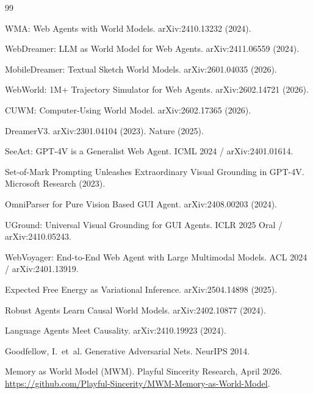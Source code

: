 \documentclass[12pt]{article}
\theoremstyle{definition}
\theoremstyle{remark}
\begin{document}
\begin{thebibliography}{99}

WMA: Web Agents with World Models. arXiv:2410.13232 (2024).

WebDreamer: LLM as World Model for Web Agents. arXiv:2411.06559 (2024).

MobileDreamer: Textual Sketch World Models. arXiv:2601.04035 (2026).

WebWorld: 1M+ Trajectory Simulator for Web Agents. arXiv:2602.14721 (2026).

CUWM: Computer-Using World Model. arXiv:2602.17365 (2026).

DreamerV3. arXiv:2301.04104 (2023). Nature (2025).

SeeAct: GPT-4V is a Generalist Web Agent. ICML 2024 / arXiv:2401.01614.

Set-of-Mark Prompting Unleashes Extraordinary Visual Grounding in GPT-4V.
Microsoft Research (2023).

OmniParser for Pure Vision Based GUI Agent. arXiv:2408.00203 (2024).

UGround: Universal Visual Grounding for GUI Agents. ICLR 2025 Oral /
arXiv:2410.05243.

WebVoyager: End-to-End Web Agent with Large Multimodal Models. ACL 2024 /
arXiv:2401.13919.

Expected Free Energy as Variational Inference. arXiv:2504.14898 (2025).

Robust Agents Learn Causal World Models. arXiv:2402.10877 (2024).

Language Agents Meet Causality. arXiv:2410.19923 (2024).

Goodfellow, I.~et~al. Generative Adversarial Nets. NeurIPS 2014.

Memory as World Model (MWM). Playful Sincerity Research, April 2026. \\
\url{https://github.com/Playful-Sincerity/MWM-Memory-as-World-Model}.

\end{thebibliography}
\end{document}
